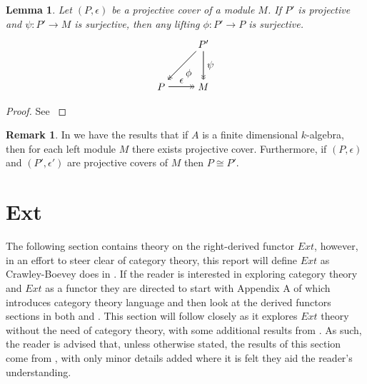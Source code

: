 \documentclass[11.5pt, twoside, a4paper, titlepage]{report}
\theoremstyle{definition}
\newtheorem{rem}[mydef]{Remark}
\theoremstyle{plain}
\newtheorem{lem}[mydef]{Lemma}
\begin{document}
\begin{lem}
Let $(P,\epsilon)$ be a projective cover of a module $M$. If $P'$ is projective and $\psi: P' \to M$ is surjective, then any lifting $\phi: P' \to P$ is surjective.
\begin{equation*}
\begin{tikzpicture}[->,-latex, auto, main path/.style={->>, semithick}, main node/.style={}]
\node	[main node]		(2) at (0,0)			{$P$};
\node	[main node]		(3) at (1.5,0)		{$M$};
\node [main node]		(4) at (1.5,1.5)		{$P'$};

\draw (2) edge [main path] node [auto] {$\epsilon$} (3);
\draw (4) edge [main path] node [auto] {$\psi$} (3);
\draw (4) edge [main path] node [auto] {$\phi$} (2);
\end{tikzpicture}
\end{equation*}
\end{lem}
\begin{proof}
See \cite{Rotman}
\end{proof}

\begin{rem}
In \cite{Vale} we have the results that if $A$ is a finite dimensional $k$-algebra, then for each left module $M$ there exists projective cover. Furthermore, if $(P, \epsilon)$ and $(P', \epsilon')$ are projective covers of $M$ then $P\cong P'$.
\end{rem}


\section{Ext}

The following section contains theory on the right-derived functor $Ext$, however, in an effort to steer clear of category theory, this report will define $Ext$ as Crawley-Boevey does in \cite{CB1}. If the reader is interested in exploring category theory and $Ext$ as a functor they are directed to start with Appendix A of \cite{Weibel} which introduces category theory language and then look at the derived functors sections in both \cite{Weibel} and \cite{Rotman}. This section will follow \cite{CB1} closely as it explores $Ext$ theory without the need of category theory, with some  additional results from \cite{Weibel}. As such, the reader is advised that, unless otherwise stated, the results of this section come from \cite{CB1}, with only minor details added where it is felt they aid the reader's understanding.
\end{document}
